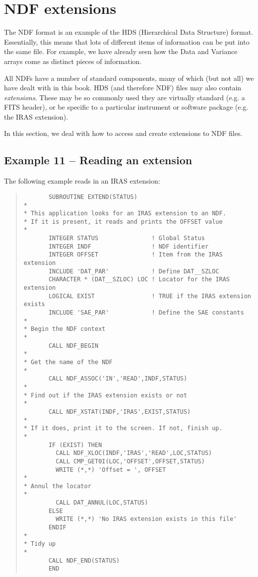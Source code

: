 \section{NDF extensions}

The NDF format is an example of the HDS (Hierarchical Data Structure) format.
Essentially, this means that lots of different items of
information can be put into the same file. For example, we have
already seen how the Data and Variance arrays come as distinct pieces
of information.

All NDFs have a number of standard components, many of which (but not
all) we have dealt with in this book. HDS (and therefore NDF) files
may
also contain {\em extensions}. These may be so commonly used they are
virtually standard (e.g. a FITS header), or be specific to a particular
instrument or software package (e.g. the IRAS extension).

In this section, we deal with how to access and create extensions to
NDF files.

\subsection{Example 11 -- Reading an extension}

The following example reads in an IRAS extension:

\begin{quote}
{\small
\begin{verbatim}
       SUBROUTINE EXTEND(STATUS)
*
* This application looks for an IRAS extension to an NDF.
* If it is present, it reads and prints the OFFSET value
*
       INTEGER STATUS               ! Global Status
       INTEGER INDF                 ! NDF identifier
       INTEGER OFFSET               ! Item from the IRAS extension
       INCLUDE 'DAT_PAR'            ! Define DAT__SZLOC
       CHARACTER * (DAT__SZLOC) LOC ! Locator for the IRAS extension
       LOGICAL EXIST                ! TRUE if the IRAS extension exists
       INCLUDE 'SAE_PAR'            ! Define the SAE constants
*
* Begin the NDF context
*
       CALL NDF_BEGIN
*
* Get the name of the NDF
*
       CALL NDF_ASSOC('IN','READ',INDF,STATUS)
*
* Find out if the IRAS extension exists or not
*
       CALL NDF_XSTAT(INDF,'IRAS',EXIST,STATUS)
*
* If it does, print it to the screen. If not, finish up.
*
       IF (EXIST) THEN
         CALL NDF_XLOC(INDF,'IRAS','READ',LOC,STATUS)
         CALL CMP_GET0I(LOC,'OFFSET',OFFSET,STATUS)
         WRITE (*,*) 'Offset = ', OFFSET
*
* Annul the locator
*
         CALL DAT_ANNUL(LOC,STATUS)
       ELSE
         WRITE (*,*) 'No IRAS extension exists in this file'
       ENDIF
*
* Tidy up
*
       CALL NDF_END(STATUS)
       END
\end{verbatim}
}
\end{quote}

